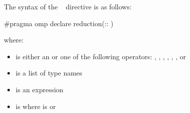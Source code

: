 \begin{cppspecific}
The syntax of the ~ directive is as follows:

\begin{ompcPragma}
#pragma omp declare reduction(::
)
\end{ompcPragma}

where:

\begin{itemize}
\item {} is either an  or one of 
      the following operators: \code{+}, \code{-}, \code{*}, \code{&}, \code{|},
      \code{^}, \code{&&} or \code{||}
\item {} is a list of type names
\item {} is an expression

\item {} is \code{)}
      where  is\linebreak 
        or \code{(}\code{)}
\end{itemize}
\end{cppspecific}


